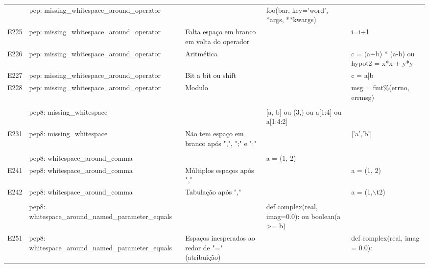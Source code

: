 \begin{landscape}
\begin{table}
\begin{tabularx}{\linewidth}{ |p{0.5cm}|p{6cm}|p{5.5cm}|X|X|}
				&   
				&   
				&   
				&  \\ 
				\hline
				
				& pep: missing\_whitespace\_around\_operator 
				&   
				& foo(bar, key='word', *args, **kwargs)  
				&  \\ 
				\hline
				E225 
				& pep: missing\_whitespace\_around\_operator 
				& Falta espaço em branco em volta do operador 
				&   
				& i=i+1 \\ 
				\hline
				E226 
				& pep: missing\_whitespace\_around\_operator 
				& Aritmética 
				&   
				& c = (a+b) * (a-b) ou hypot2 = x*x + y*y \\ 
				\hline
				E227 
				& pep: missing\_whitespace\_around\_operator 
				& Bit a bit ou shift 
				&   
				& c = a|b \\ 
				\hline
				E228 
				& pep: missing\_whitespace\_around\_operator 
				& Modulo 
				&   
				& msg = fmt\%(errno, errmsg) \\ 
				\hline
				
				&   
				&   
				&   
				&  \\ 
				\hline
				
				& pep8: missing\_whitespace 
				&   
				& [a, b] ou (3,) ou a[1:4] ou a[1:4:2]  
				&  \\ 
				\hline
				E231 
				& pep8: missing\_whitespace 
				& Não tem espaço em branco após ",", ";" e ":" 
				&   
				& ['a','b'] \\ 
				\hline
				
				&   
				&   
				&   
				&  \\ 
				\hline
				
				& pep8: whitespace\_around\_comma 
				&   
				& a = (1, 2)  
				&  \\ 
				\hline
				E241 
				& pep8: whitespace\_around\_comma 
				& Múltiplos espaços após "," 
				&   
				& a = (1,  2) \\ 
				\hline
				E242 
				& pep8: whitespace\_around\_comma 
				& Tabulação após "," 
				&   
				& a = (1,$\backslash$t2) \\ 
				\hline
				
				&   
				&   
				&   
				&  \\ 
				\hline
				
				& pep8: whitespace\_around\_named\_parameter\_equals 
				&   
				& def complex(real, imag=0.0): ou boolean(a >= b)  
				&  \\ 
				\hline
				E251 
				& pep8: whitespace\_around\_named\_parameter\_equals 
				& Espaços inesperados ao redor de "=" (atribuição) 
				&   
				& def complex(real, imag = 0.0): \\ 
				\hline
				

\end{tabularx}
\end{table}
\end{landscape}
